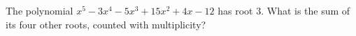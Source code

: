 The polynomial $x^5-3x^4-5x^3+15x^2+4x-12$ has root 3. What is the sum of its four other roots, counted with multiplicity?

